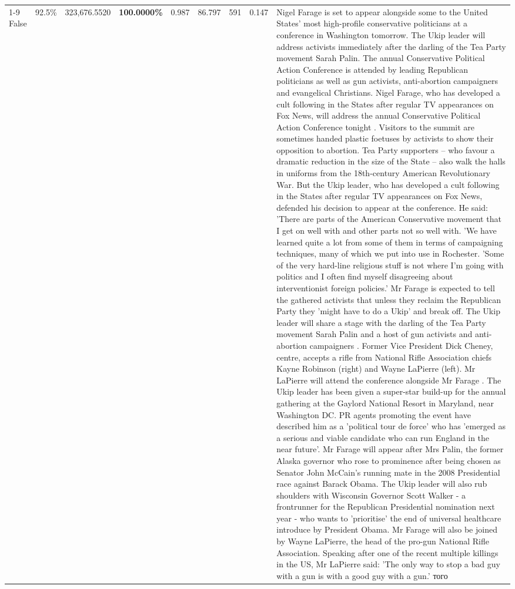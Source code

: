 \begin{table}[H]
\begin{tabular}{lllrlllll}
\cline{1-9} \cline{2-9}
False & 92.5\% & 323,676.5520 & \bfseries \color{red} 100.0000\% & 0.987 & 86.797 & 591 & 0.147 & Nigel Farage is set to appear alongside some to the United States' most high-profile conservative politicians at a conference in Washington tomorrow. The Ukip leader will address activists immediately after the darling of the Tea Party movement Sarah Palin. The annual Conservative Political Action Conference is attended by leading Republican politicians as well as gun activists, anti-abortion campaigners and evangelical Christians. Nigel Farage, who has developed a cult following in the States after regular TV appearances on Fox News, will address the annual Conservative Political Action Conference tonight . Visitors to the summit are sometimes handed plastic foetuses by activists to show their opposition to abortion. Tea Party supporters – who favour a dramatic reduction in the size of the State – also walk the halls in uniforms from the 18th-century American Revolutionary War. But the Ukip leader, who has developed a cult following in the States after regular TV appearances on Fox News, defended his decision to appear at the conference. He said: 'There are parts of the American Conservative movement that I get on well with and other parts not so well with. 'We have learned quite a lot from some of them in terms of campaigning techniques, many of which we put into use in Rochester. 'Some of the very hard-line religious stuff is not where I'm going with politics and I often find myself disagreeing about interventionist foreign policies.' Mr Farage is expected to tell the gathered activists that unless they reclaim the Republican Party they 'might have to do a Ukip' and break off. The Ukip leader will share a stage with the darling of the Tea Party movement Sarah Palin and a host of gun activists and anti-abortion campaigners . Former Vice President Dick Cheney, centre, accepts a rifle from National Rifle Association chiefs Kayne Robinson (right) and Wayne LaPierre (left). Mr LaPierre will attend the conference alongside Mr Farage . The Ukip leader has been given a super-star build-up for the annual gathering at the Gaylord National Resort in Maryland, near Washington DC. PR agents promoting the event have described him as a 'political tour de force' who has 'emerged as a serious and viable candidate who can run England in the near future'. Mr Farage will appear after Mrs Palin, the former Alaska governor who rose to prominence after being chosen as Senator John McCain's running mate in the 2008 Presidential race against Barack Obama. The Ukip leader will also rub shoulders with Wisconsin Governor Scott Walker - a frontrunner for the Republican Presidential nomination next year - who wants to 'prioritise' the end of universal healthcare introduce by President Obama. Mr Farage will also be joined by Wayne LaPierre, the head of the pro-gun National Rifle Association. Speaking after one of the recent multiple killings in the US, Mr LaPierre said: 'The only way to stop a bad guy with a gun is with a good guy with a gun.' того \\

\end{tabular}
\end{table}
